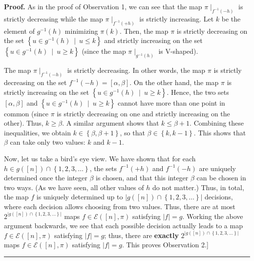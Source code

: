 \documentclass[numbers=enddot,12pt,final,onecolumn,notitlepage]{scrartcl}%
\theoremstyle{definition}
\newenvironment{proof}[1][Proof]{\noindent\textbf{#1.} }{\ \rule{0.5em}{0.5em}}
\begin{document}
\begin{proof}
As in the proof of Observation 1, we can see that the map $\pi\mid
_{f^{-1}\left(  -h\right)  }$ is strictly decreasing while the map $\pi
\mid_{f^{-1}\left(  +h\right)  }$ is strictly increasing. Let $k$ be the
element of $g^{-1}\left(  h\right)  $ minimizing $\pi\left(  k\right)  $.
Then, the map $\pi$ is strictly decreasing on the set $\left\{  u\in
g^{-1}\left(  h\right)  \ \mid\ u\leq k\right\}  $ and strictly increasing on
the set $\left\{  u\in g^{-1}\left(  h\right)  \ \mid\ u\geq k\right\}  $
(since the map $\pi\mid_{g^{-1}\left(  h\right)  }$ is V-shaped).

The map $\pi\mid_{f^{-1}\left(  -h\right)  }$ is strictly decreasing. In other
words, the map $\pi$ is strictly decreasing on the set $f^{-1}\left(
-h\right)  =\left[  \alpha,\beta\right]  $. On the other hand, the map $\pi$
is strictly increasing on the set $\left\{  u\in g^{-1}\left(  h\right)
\ \mid\ u\geq k\right\}  $. Hence, the two sets $\left[  \alpha,\beta\right]
$ and $\left\{  u\in g^{-1}\left(  h\right)  \ \mid\ u\geq k\right\}  $ cannot
have more than one point in common (since $\pi$ is strictly decreasing on one
and strictly increasing on the other). Thus, $k\geq\beta$. A similar argument
shows that $k\leq\beta+1$. Combining these inequalities, we obtain
$k\in\left\{  \beta,\beta+1\right\}  $, so that $\beta\in\left\{
k,k-1\right\}  $. This shows that $\beta$ can take only two values: $k$ and
$k-1$.

Now, let us take a bird's eye view. We have shown that for each $h\in g\left(
\left[  n\right]  \right)  \cap\left\{  1,2,3,\ldots\right\}  $, the sets
$f^{-1}\left(  +h\right)  $ and $f^{-1}\left(  -h\right)  $ are uniquely
determined once the integer $\beta$ is chosen, and that this integer $\beta$
can be chosen in two ways. (As we have seen, all other values of $h$ do not
matter.) Thus, in total, the map $f$ is uniquely determined up to $\left\vert
g\left(  \left[  n\right]  \right)  \cap\left\{  1,2,3,\ldots\right\}
\right\vert $ decisions, where each decision allows choosing from two values.
Thus, there are at most $2^{\left\vert g\left(  \left[  n\right]  \right)
\cap\left\{  1,2,3,\ldots\right\}  \right\vert }$ maps $f\in\mathcal{E}\left(
\left[  n\right]  ,\pi\right)  $ satisfying $\left\vert f\right\vert =g$.
Working the above argument backwards, we see that each possible decision
actually leads to a map $f\in\mathcal{E}\left(  \left[  n\right]  ,\pi\right)
$ satisfying $\left\vert f\right\vert =g$; thus, there are \textbf{exactly}
$2^{\left\vert g\left(  \left[  n\right]  \right)  \cap\left\{  1,2,3,\ldots
\right\}  \right\vert }$ maps $f\in\mathcal{E}\left(  \left[  n\right]
,\pi\right)  $ satisfying $\left\vert f\right\vert =g$. This proves
Observation 2.]
\end{proof}
\end{document}
